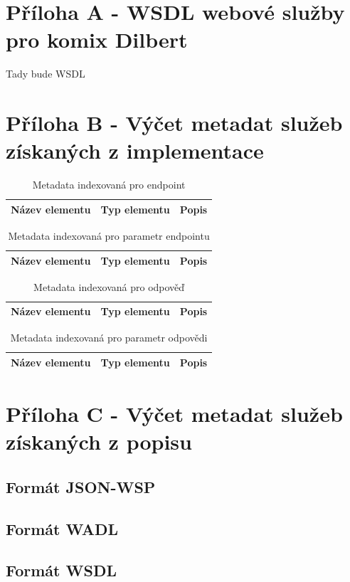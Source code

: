 \documentclass[czech,DP]{thesiskiv}
\begin{document}
\chapter*{Příloha A - WSDL webové služby pro komix Dilbert}
Tady bude WSDL


\chapter*{Příloha B - Výčet metadat služeb získaných z implementace}
\begin{table}[h]
	\centering
	\begin{tabular}{|l|c|c|}
		\hline
		Název elementu & Typ elementu & Popis \\ 
		\hline
		\hline
	\end{tabular}
	\caption{Metadata indexovaná pro endpoint}
\end{table}

\begin{table}[h]
	\centering
	\begin{tabular}{|l|c|c|}
		\hline
		Název elementu & Typ elementu & Popis \\ 
		\hline
		\hline
	\end{tabular}
	\caption{Metadata indexovaná pro parametr endpointu}
\end{table}

\begin{table}[h]
	\centering
	\begin{tabular}{|l|c|c|}
		\hline
		Název elementu & Typ elementu & Popis \\ 
		\hline
		\hline
	\end{tabular}
	\caption{Metadata indexovaná pro odpověď}
\end{table}

\begin{table}[h]
	\centering
	\begin{tabular}{|l|c|c|}
		\hline
		Název elementu & Typ elementu & Popis \\ 
		\hline
		\hline
	\end{tabular}
	\caption{Metadata indexovaná pro parametr odpovědi}
\end{table}

\chapter*{Příloha C - Výčet metadat služeb získaných z popisu}

\section*{Formát JSON-WSP}

\section*{Formát WADL}

\section*{Formát WSDL}
\end{document}
